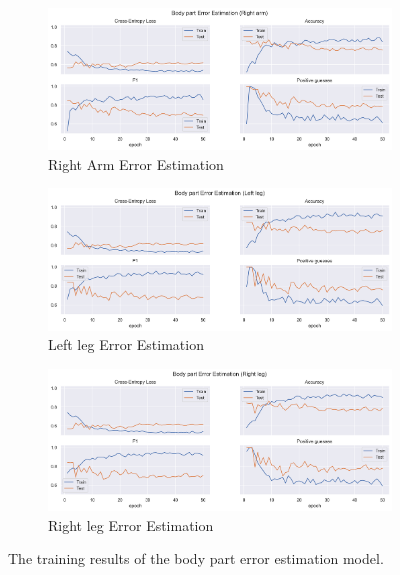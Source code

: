 \begin{figure}[htbp]
  \begin{subfigure}[b]{0.9\linewidth}
      \centering
      \includegraphics[width=\textwidth]{figures/Results/v1/bp/Right arm_ErrorEstimation.png}
      \caption{Right Arm Error Estimation}
      \label{fig:riar_lb_ee}
  \end{subfigure}
  \hfill
  \begin{subfigure}[b]{0.9\linewidth}
      \centering
      \includegraphics[width=\textwidth]{figures/Results/v1/bp/Left leg_ErrorEstimation.png}
      \caption{Left leg Error Estimation}
      \label{fig:lele_lb_ee}
  \end{subfigure}
  \hfill
  \begin{subfigure}[b]{0.9\linewidth}
      \centering
      \includegraphics[width=\textwidth]{figures/Results/v1/bp/Right leg_ErrorEstimation.png}
      \caption{Right leg Error Estimation}
      \label{fig:rileg_lb_ee}
  \end{subfigure}
  \hfill
  \caption[Body Parts model training results]{The training results of the body part error estimation model.}
  \label{fig:body part_training_results}
\end{figure}

